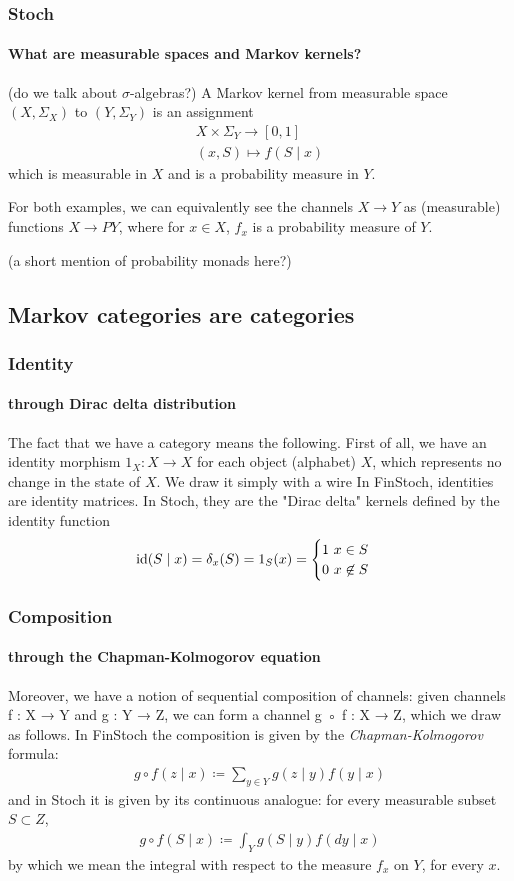 \begin{frame}
    \frametitle{Stoch}
    \framesubtitle{What are measurable spaces and Markov kernels?}
    (do we talk about $\sigma$-algebras?)
    A Markov kernel from measurable space $(X, \Sigma_X)$ to $(Y, \Sigma_Y)$ is an assignment
    \begin{align*}
        X\times \Sigma_Y \to [0, 1]\\
        (x, S) \mapsto f(S\mid x)
    \end{align*}
    which is measurable in $X$ and is a probability measure in $Y$.
\end{frame}

\begin{frame}
    For both examples, we can equivalently see the channels $X\to Y$ as (measurable) functions $X\to PY$, where for $x\in X$, $f_x$ is a probability measure of $Y$.

    (a short mention of probability monads here?)
    
\end{frame}

\subsection{Markov categories are categories}

\begin{frame}
    \frametitle{Identity}
    \framesubtitle{through Dirac delta distribution}
    The fact that we have a category means the following. First of all, we have an identity morphism $1_X: X\to X$ for each object (alphabet) $X$, which represents no change in the state of $X$. We draw it simply with a wire
    In FinStoch, identities are identity matrices. In Stoch, they are the "Dirac delta" kernels defined by the identity function
    \[
        \text{\normalfont id} (S\mid x) = \delta_x (S) = 1_S(x) = \begin{cases} 1\ x\in S\\ 0\ x\not \in S
        \end{cases}
    \]
\end{frame}

\begin{frame}
    \frametitle{Composition}
    \framesubtitle{through the Chapman-Kolmogorov equation}
    Moreover, we have a notion of sequential composition of channels: given channels f : X → Y and g : Y → Z, we can form a channel g ◦ f : X → Z, which we draw as follows.
    In FinStoch the composition is given by the \emph{Chapman-Kolmogorov} formula:
    \begin{align}
        g\circ f (z\mid x) \coloneqq \sum_{y\in Y} g(z\mid y) f(y\mid x)
    \end{align}
    and in Stoch it is given by its continuous analogue: for every measurable subset $S\subset Z$,
    \begin{align}
        g\circ f (S\mid x) \coloneqq \int_Y g(S\mid y) f(dy\mid x)
    \end{align}
    by which we mean the integral with respect to the measure $f_x$ on $Y$, for every $x$.
\end{frame}

